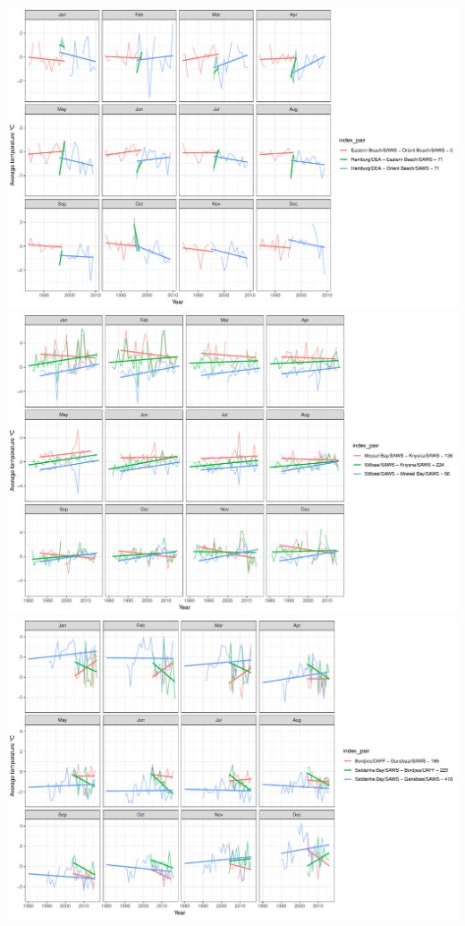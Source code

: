 \documentclass[12pt,]{article}
\begin{document}
\includegraphics{figures/SACTN_clust_1_plot2.pdf}
\includegraphics{figures/SACTN_clust_2_plot2.pdf}
\includegraphics{figures/SACTN_clust_3_plot2.pdf}
\end{document}

